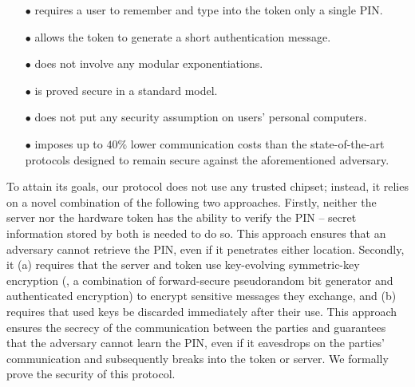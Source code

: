 \begin{itemize}
\item[$\bullet$] requires a user to remember and type into the token only a single PIN.

\item[$\bullet$] {allows the token to generate a short authentication message.} 

\item[$\bullet$] does not involve any modular exponentiations.

\item[$\bullet$] is proved secure in a standard model.

\item[$\bullet$] does not put any security assumption on users' personal computers.

\item[$\bullet$]  imposes up to $40\%$ lower communication costs than the state-of-the-art protocols designed to remain secure against the aforementioned adversary. 


\end{itemize}

To attain its goals, our protocol does not use any trusted chipset; instead, it relies on a novel combination of the following two approaches. Firstly, neither the server nor the hardware token has the ability to verify the PIN -- secret information stored by both is needed to do so. This approach ensures that an adversary cannot retrieve the PIN, even if it penetrates either location. 
Secondly, it  (a) requires that the server and token use key-evolving symmetric-key encryption (\ie, a combination of forward-secure pseudorandom bit generator and authenticated encryption) to encrypt sensitive messages they exchange,  and (b) requires that used keys be discarded immediately after their use.
This approach ensures the secrecy of the communication between the parties and guarantees that the adversary cannot learn the PIN, even if it eavesdrops on the parties' communication and subsequently breaks into the token or server. We formally prove the security of this protocol. 





